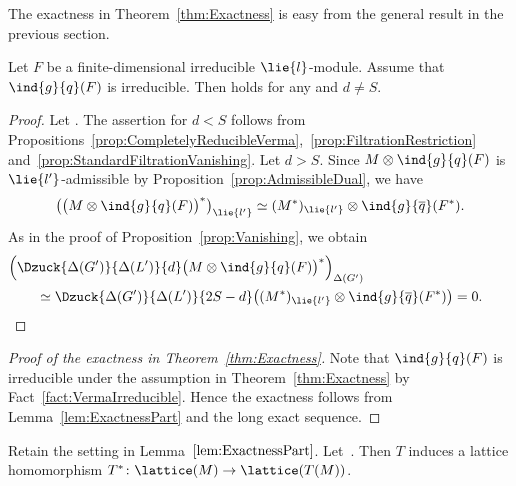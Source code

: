 The exactness in Theorem~\ref{thm:Exactness} is easy from the general result in the previous section.

\begin{Lemma}\label{lem:ExactnessPart}
	Let $F$ be a finite-dimensional irreducible $\lie{l}$-module.
	Assume that $\ind{g}{q}(F)$ is irreducible.
	Then  holds
	for any  and $d \neq S$.
\end{Lemma}
	
\begin{proof}
	Let .
	The assertion for $d < S$ follows from Propositions~\ref{prop:CompletelyReducibleVerma},~\ref{prop:FiltrationRestriction} and~\ref{prop:StandardFiltrationVanishing}.
	Let $d > S$.
	Since $M\otimes \ind{g}{q}(F)$ is $\lie{l'}$-admissible by Proposition~\ref{prop:AdmissibleDual}, we have
	\begin{align*}
		\bigl(\bigl(M\otimes \ind{g}{q}(F)\bigr)^*\bigr)_{\lie{l'}} \simeq (M^*)_{\lie{l'}} \otimes \ind{g}{\overline{q}}(F^*).
	\end{align*}
	As in the proof of Proposition~\ref{prop:Vanishing}, we obtain
	\begin{align*}
		&\Bigl(\Dzuck{\Delta(G')}{\Delta(L')}{d}\bigl(M\otimes \ind{g}{q}(F)\bigr)^*\Bigr)_{\Delta(G')} \\
		&\qquad{}\simeq \Dzuck{\Delta(G')}{\Delta(L')}{2S - d}\bigl((M^*)_{\lie{l'}} \otimes \ind{g}{\overline{q}}(F^*)\bigr) = 0.
		\qedhere
 \tag*{\qed}
 \end{align*}
 \renewcommand{\qed}{}
\end{proof}

\begin{proof}[Proof of the exactness in Theorem~\ref{thm:Exactness}]
	Note that $\ind{g}{q}(F)$ is irreducible under the assumption in Theorem~\ref{thm:Exactness} by Fact~\ref{fact:VermaIrreducible}.
	Hence the exactness follows from Lemma~\ref{lem:ExactnessPart} and the long exact sequence.
\end{proof}

\begin{Corollary}\label{cor:LatticeHom}
	Retain the setting in Lemma~$\ref{lem:ExactnessPart}$.
	Let~.
	Then $T$ induces a lattice homomorphism $T^* \colon \lattice(M)\rightarrow \lattice(T(M))$.
\end{Corollary}

